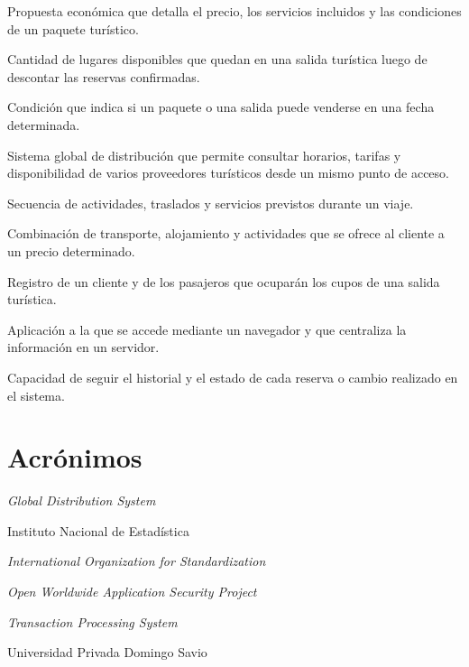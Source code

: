 
\begin{description}[style=nextline,leftmargin=1.27cm,labelindent=0pt,%
  labelsep=0.4em,font=\bfseries,itemsep=0.25\baselineskip]
  \item[Cotización] Propuesta económica que detalla el precio, los
        servicios incluidos y las condiciones de un paquete turístico.
  \item[Cupo] Cantidad de lugares disponibles que quedan en una salida
        turística luego de descontar las reservas confirmadas.
  \item[Disponibilidad] Condición que indica si un paquete o una salida
        puede venderse en una fecha determinada.
  \item[GDS] Sistema global de distribución que permite consultar
        horarios, tarifas y disponibilidad de varios proveedores
        turísticos desde un mismo punto de acceso.
  \item[Itinerario] Secuencia de actividades, traslados y servicios
        previstos durante un viaje.
  \item[Paquete turístico] Combinación de transporte, alojamiento y
        actividades que se ofrece al cliente a un precio determinado.
  \item[Reserva] Registro de un cliente y de los pasajeros que ocuparán
        los cupos de una salida turística.
  \item[Sistema web] Aplicación a la que se accede mediante un navegador
        y que centraliza la información en un servidor.
  \item[Trazabilidad] Capacidad de seguir el historial y el estado de
        cada reserva o cambio realizado en el sistema.
\end{description}

\section*{Acrónimos}

\begin{description}[style=nextline,leftmargin=1.27cm,labelindent=0pt,%
  labelsep=0.4em,font=\bfseries,itemsep=0.15\baselineskip]
  \item[GDS] \emph{Global Distribution System}
  \item[INE] Instituto Nacional de Estadística
  \item[ISO] \emph{International Organization for Standardization}
  \item[OWASP] \emph{Open Worldwide Application Security Project}
  \item[TPS] \emph{Transaction Processing System}
  \item[UPDS] Universidad Privada Domingo Savio
\end{description}
